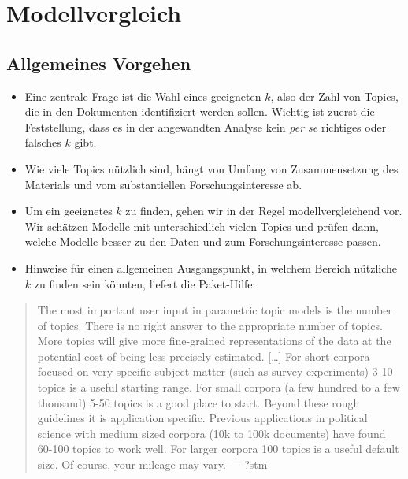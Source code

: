 \documentclass[
]{book}
\providecommand{\tightlist}{%
  \setlength{\itemsep}{0pt}\setlength{\parskip}{0pt}}
\begin{document}
\hypertarget{modellvergleich}{%
\section{Modellvergleich}\label{modellvergleich}}

\hypertarget{allgemeines-vorgehen}{%
\subsection*{Allgemeines Vorgehen}\label{allgemeines-vorgehen}}

\begin{itemize}
\tightlist
\item
  Eine zentrale Frage ist die Wahl eines geeigneten \(k\), also der Zahl von Topics, die in den Dokumenten identifiziert werden sollen. Wichtig ist zuerst die Feststellung, dass es in der angewandten Analyse kein \emph{per se} richtiges oder falsches \(k\) gibt.
\item
  Wie viele Topics nützlich sind, hängt von Umfang von Zusammensetzung des Materials und vom substantiellen Forschungsinteresse ab.
\item
  Um ein geeignetes \(k\) zu finden, gehen wir in der Regel modellvergleichend vor. Wir schätzen Modelle mit unterschiedlich vielen Topics und prüfen dann, welche Modelle besser zu den Daten und zum Forschungsinteresse passen.
\item
  Hinweise für einen allgemeinen Ausgangspunkt, in welchem Bereich nützliche \(k\) zu finden sein könnten, liefert die Paket-Hilfe:
\end{itemize}

\begin{quote}
The most important user input in parametric topic models is the number of topics. There is no right answer to the appropriate number of topics. More topics will give more fine-grained representations of the data at the potential cost of being less precisely estimated. {[}\ldots{]} For short corpora focused on very specific subject matter (such as survey experiments) 3-10 topics is a useful starting range. For small corpora (a few hundred to a few thousand) 5-50 topics is a good place to start. Beyond these rough guidelines it is application specific. Previous applications in political science with medium sized corpora (10k to 100k documents) have found 60-100 topics to work well. For larger corpora 100 topics is a useful default size. Of course, your mileage may vary. --- ?stm
\end{quote}
\end{document}
